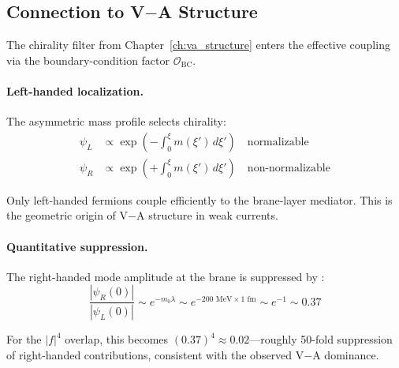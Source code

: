 \subsection{\texorpdfstring{Connection to V$-$A Structure}{Connection to V-A Structure}}
\label{sec:ch11_va}

The chirality filter from Chapter~\ref{ch:va_structure} enters the effective
coupling via the boundary-condition factor $\mathcal{O}_{\text{BC}}$.

\paragraph{Left-handed localization.}
The asymmetric mass profile selects chirality:
\begin{align}
    \psi_L &\propto \exp\left(-\int_0^\xi m(\xi')\,d\xi'\right) \quad \text{normalizable} \\
    \psi_R &\propto \exp\left(+\int_0^\xi m(\xi')\,d\xi'\right) \quad \text{non-normalizable}
\end{align}

Only left-handed fermions couple efficiently to the brane-layer mediator.
This is the geometric origin of V$-$A structure in weak currents.

\paragraph{Quantitative suppression.}
The right-handed mode amplitude at the brane is suppressed by \tagDc{}:
\begin{equation}
    \frac{|\psi_R(0)|}{|\psi_L(0)|} \sim e^{-m_0\lambda} \sim e^{-200 \text{ MeV} \times 1 \text{ fm}}
    \sim e^{-1} \sim 0.37
    \label{eq:ch11_chiral_suppression}
\end{equation}

For the $|f|^4$ overlap, this becomes $(0.37)^4 \approx 0.02$---roughly 50-fold
suppression of right-handed contributions, consistent with the observed
V$-$A dominance.


